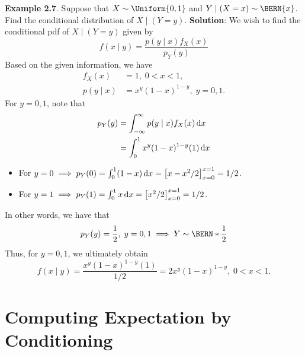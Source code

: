 \begin{Example}
    \textbf{Example 2.7}. Suppose that $ X \sim \Uniform{0,1} $ and $ Y\mid(X=x)\sim \BERN{x} $. Find the conditional distribution of $ X\mid(Y=y) $.
    \tcblower{}
    \textbf{Solution}: We wish to find the conditional pdf of $ X\mid (Y=y) $ given by
    \[ f(x\mid y)=\frac{p(y\mid x)f_X(x)}{p_Y(y)} \]
    Based on the given information, we have
    \begin{align*}
        f_X(x)     & =1,\;0<x<1,              \\
        p(y\mid x) & =x^y(1-x)^{1-y},\;y=0,1.
    \end{align*}
    For $ y=0,1 $, note that
    \begin{align*}
        p_Y(y)
         & =\int_{-\infty}^{\infty}p(y\mid x)f_X(x)\odif{x} \\
         & =\int_{0}^{1}x^y (1-x)^{1-y}(1)\odif{x}
    \end{align*}
    \begin{itemize}
        \item For $ y=0\implies p_Y(0)=\int_{0}^{1}(1-x)\odif{x}=\bigl[x-x^2/2\bigr]_{x=0}^{x=1}=1/2 $.
        \item For $ y=1\implies p_Y(1)=\int_{0}^{1}x\odif{x}=\bigl[x^2/2\bigr]_{x=0}^{x=1}=1/2 $.
    \end{itemize}
    In other words, we have that
    \[ p_Y(y)=\frac{1}{2} ,\; y=0,1\implies Y \sim \BERN*{\frac{1}{2} } \]
    Thus, for $ y=0,1 $, we ultimately obtain
    \[ f(x\mid y)=\frac{x^y(1-x)^{1-y}(1)}{1/2}=2x^y(1-x)^{1-y},\; 0<x<1. \]
\end{Example}
\section{Computing Expectation by Conditioning}
